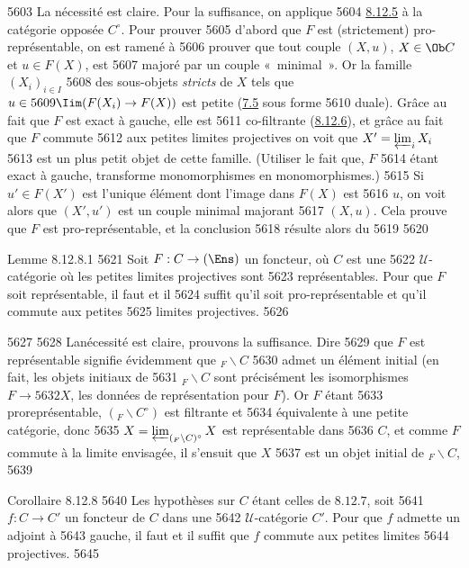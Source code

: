   5603	La nécessité est claire. Pour la suffisance, on applique
  5604	\hyperref[I.prop8.12.5]{8.12.5}  à la catégorie opposée $C^\circ$. Pour prouver
  5605	d'abord que $F$ est (strictement) pro-représentable, on est ramené à
  5606	prouver que tout couple $(X,u)$, $X\in \Ob C$ et $u\in F(X)$, est
  5607	majoré par un couple « minimal ». Or la famille $(X_i)_{i\in I}$
  5608	des sous-objets \emph{stricts} de $X$ tels que $u\in
  5609	\Iim(F(X_i)\rightarrow F(X))$ est petite (\hyperref[I.cor7.5]{7.5} sous forme
  5610	duale). Grâce au fait que $F$ est exact à gauche, elle est
  5611	co-filtrante (\hyperref[I.rem8.12.6]{8.12.6}), et grâce au fait que $F$ commute
  5612	aux petites limites projectives on voit que $X'=\varprojlim_i X_i$
  5613	est un plus petit objet de cette famille. (Utiliser le fait que, $F$
  5614	étant exact à gauche, transforme monomorphismes en monomorphismes.)
  5615	Si $u'\in F(X')$ est l'unique élément dont l'image dans $F(X)$ est
  5616	$u$, on voit alors que $(X',u')$ est un couple minimal majorant
  5617	$(X,u)$. Cela prouve que $F$ est pro-représentable, et la conclusion
  5618	résulte alors du
  5619	
  5620	\begin{enonce*}{Lemme 8.12.8.1}
  5621	Soit $F:C\rightarrow(\Ens)$ un foncteur, où $C$ est une
  5622	$𝒰$-catégorie où les petites limites projectives sont
  5623	représentables. Pour que $F$ soit représentable, il faut et il
  5624	suffit qu'il soit pro-représentable et qu'il commute aux petites
  5625	limites projectives.
  5626	\end{enonce*}
  5627	
  5628	La\pageoriginale nécessité est claire, prouvons la suffisance. Dire
  5629	que $F$ est représentable signifie évidemment que ${}_F\backslash C$
  5630	admet un élément initial (en fait, les objets initiaux de
  5631	${}_F\backslash C$ sont précisément les isomorphismes $F\rightarrow
  5632	X$, \ie les données de représentation pour $F$). Or $F$ étant
  5633	proreprésentable, $({}_F\backslash C^\circ)$ est filtrante et
  5634	équivalente à une petite catégorie, donc
  5635	$X=\varprojlim_{({}_F\backslash C)^\circ} X$ est représentable dans
  5636	$C$, et comme $F$ commute à la limite envisagée, il s'ensuit que $X$
  5637	est un objet initial de ${}_F\backslash C$, 	
  5639	\begin{enonce*}{Corollaire 8.12.8}
  5640	Les hypothèses sur $C$ étant celles de $8.12.7$, soit
  5641	$f:C\rightarrow C'$ un foncteur de $C$ dans une
  5642	$𝒰$-catégorie $C'$. Pour que $f$ admette un adjoint à
  5643	gauche, il faut et il suffit que $f$ commute aux petites limites
  5644	projectives.
  5645	\end{enonce*}
